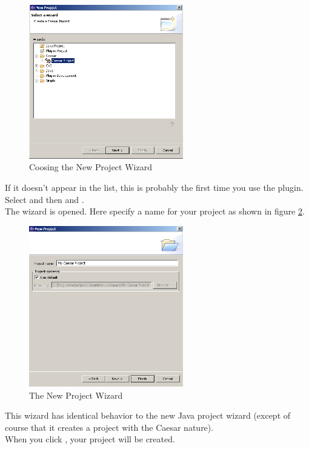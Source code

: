 \begin{figure}[htbp]
	\centering
		\includegraphics[width=0.60\textwidth]{images/project_wizard.png}
	\caption{Coosing the New Project Wizard}
	\label{fig:project_wizard}
\end{figure}

If it doesn't appear in the list, this is probably the first time you use the plugin. Select  and then  and .\\
The wizard is opened. Here specify a name for your project as shown in figure \ref{fig:project_wizard2}.

\begin{figure}[htbp]
	\centering
		\includegraphics[width=0.60\textwidth]{images/project_wizard2.png}
	\caption{The New Project Wizard}
	\label{fig:project_wizard2}
\end{figure}

This wizard has identical behavior to the new Java project wizard (except of course that
it creates a project with the Caesar nature).\\
When you click , your project will be created.